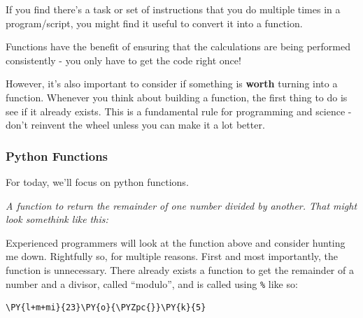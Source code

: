 If you find there's a task or set of instructions that you do multiple
times in a program/script, you might find it useful to convert it into a
function.

Functions have the benefit of ensuring that the calculations are being
performed consistently - you only have to get the code right once!

However, it's also important to consider if something is \textbf{worth}
turning into a function. Whenever you think about building a function,
the first thing to do is see if it already exists. This is a fundamental
rule for programming and science - don't reinvent the wheel unless you
can make it a lot better.

\hypertarget{python-functions}{%
\subsubsection{Python Functions}\label{python-functions}}

For today, we'll focus on python functions.

    \emph{A function to return the remainder of one number divided by
another. That might look somethink like this:}

\begin{Shaded}
\begin{Highlighting}[]
    \OperatorTok{\textgreater{}}
        \OperatorTok{{-}}
    \NormalTok{:}
\end{Highlighting}
\end{Shaded}

Experienced programmers will look at the function above and consider
hunting me down. Rightfully so, for multiple reasons. First and most
importantly, the function is unnecessary. There already exists a
function to get the remainder of a number and a divisor, called
``modulo'', and is called using \texttt{\%} like so:

    \begin{tcolorbox}[breakable, size=fbox, boxrule=1pt, pad at break*=1mm,colback=cellbackground, colframe=cellborder]
\begin{Verbatim}[commandchars=\\\{\}]
\PY{l+m+mi}{23}\PY{o}{\PYZpc{}}\PY{k}{5}
\end{Verbatim}
\end{tcolorbox}

